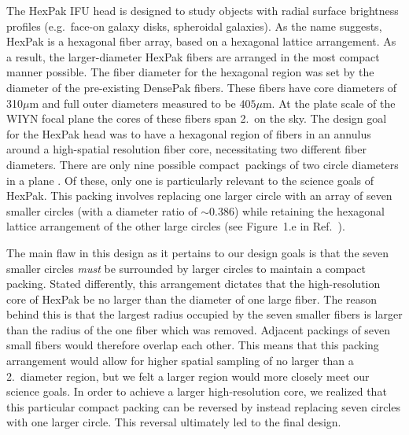 The HexPak IFU head is designed to study objects with radial surface
brightness profiles (e.g.\ face-on galaxy disks, spheroidal galaxies).  As the
name suggests, HexPak is a hexagonal fiber array, based on a hexagonal lattice
arrangement.  As a result, the larger-diameter HexPak fibers are arranged in
the most compact manner possible.  The fiber diameter for the hexagonal region
was set by the diameter of the pre-existing DensePak fibers.  These fibers
have core diameters of 310$\mu$m and full outer diameters measured to be
$405\mu$m.  At the plate scale of the WIYN focal plane the cores of these
fibers span 2.\ on the sky.  The design goal for the HexPak head was to
have a hexagonal region of fibers in an annulus around a high-spatial
resolution fiber core, necessitating two different fiber diameters.  There are
only nine possible compact\footnotemark\ packings of two circle diameters in a
plane \citep{Kennedy06}.    Of these, only one is
particularly relevant to the science goals of HexPak.  This packing involves
replacing one larger circle with an array of seven smaller circles (with a
diameter ratio of $\sim$0.386) while retaining the hexagonal lattice
arrangement of the other large circles (see Figure~1.e in
Ref.~).


The main flaw in this design as it pertains to our design goals is that the
seven smaller circles \emph{must} be surrounded by larger circles to maintain
a compact packing.  Stated differently, this arrangement dictates that the
high-resolution core of HexPak be no larger than the diameter of one large
fiber.  The reason behind this is that the largest radius occupied by the
seven smaller fibers is larger than the radius of the one fiber which was
removed.  Adjacent packings of seven small fibers would therefore overlap each
other.  This means that this packing arrangement would allow for higher
spatial sampling of no larger than a 2.\ diameter region, but we felt a
larger region would more closely meet our science goals.  In order to achieve
a larger high-resolution core, we realized that this particular compact
packing can be reversed by instead replacing seven circles with one larger
circle.  This reversal ultimately led to the final design.


